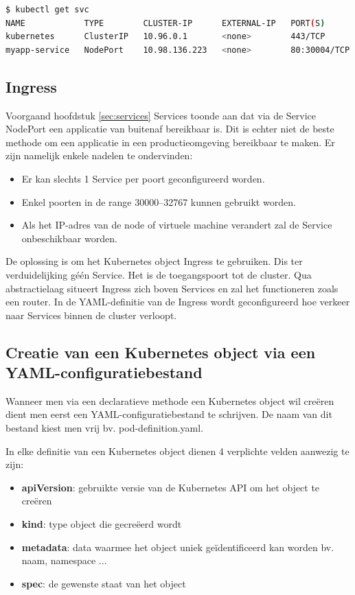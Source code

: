 \begin{lstlisting}[language=bash]
$ kubectl get svc
NAME            TYPE        CLUSTER-IP      EXTERNAL-IP   PORT(S)        AGE
kubernetes      ClusterIP   10.96.0.1       <none>        443/TCP        11d
myapp-service   NodePort    10.98.136.223   <none>        80:30004/TCP   3m17s
\end{lstlisting}

\subsection{Ingress}

Voorgaand hoofdstuk \ref{sec:services} Services toonde aan dat via de Service NodePort een applicatie van buitenaf bereikbaar is. Dit is echter niet de beste methode om een applicatie in een productieomgeving bereikbaar te maken. \autocite{Dinesh2018} Er zijn namelijk enkele nadelen te ondervinden: 
\begin{itemize}
    \item Er kan slechts 1 Service per poort geconfigureerd worden.
    \item Enkel poorten in de range 30000–32767 kunnen gebruikt worden.
    \item Als het IP-adres van de node of virtuele machine verandert zal de Service onbeschikbaar worden.
\end{itemize} 

De oplossing is om het Kubernetes object Ingress te gebruiken. Dis ter verduidelijking géén Service. Het is de toegangspoort tot de cluster. Qua abstractielaag situeert Ingress zich boven Services en zal het functioneren zoals een router. 
In de YAML-definitie van de Ingress wordt geconfigureerd hoe verkeer naar Services binnen de cluster verloopt. 

\subsection{Creatie van een Kubernetes object via een YAML-configuratiebestand}

Wanneer men via een declaratieve methode een Kubernetes object wil creëren dient men eerst een YAML-configuratiebestand te schrijven. De naam van dit bestand kiest men vrij bv. pod-definition.yaml.

In elke definitie van een Kubernetes object dienen 4 verplichte velden aanwezig te zijn:
\begin{itemize}
    \item {\bf apiVersion}: gebruikte versie van de Kubernetes API om het object te creëren
    \item {\bf kind}: type object die gecreëerd wordt
    \item {\bf metadata}: data waarmee het object uniek geïdentificeerd kan worden bv. naam, namespace ...
    \item {\bf spec}: de gewenste staat van het object
\end{itemize}


